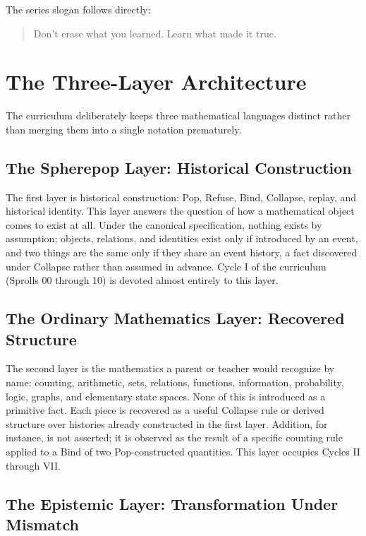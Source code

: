\documentclass[11pt,twoside]{book}
\begin{document}
The series slogan follows directly:

\begin{quote}
Don't erase what you learned. Learn what made it true.
\end{quote}

\chapter{The Three-Layer Architecture}

The curriculum deliberately keeps three mathematical languages distinct rather than merging them into a single notation prematurely.

\section{The Spherepop Layer: Historical Construction}

The first layer is historical construction: Pop, Refuse, Bind, Collapse, replay, and historical identity. This layer answers the question of how a mathematical object comes to exist at all. Under the canonical specification, nothing exists by assumption; objects, relations, and identities exist only if introduced by an event, and two things are the same only if they share an event history, a fact discovered under Collapse rather than assumed in advance. Cycle I of the curriculum (Sprolls 00 through 10) is devoted almost entirely to this layer.

\section{The Ordinary Mathematics Layer: Recovered Structure}

The second layer is the mathematics a parent or teacher would recognize by name: counting, arithmetic, sets, relations, functions, information, probability, logic, graphs, and elementary state spaces. None of this is introduced as a primitive fact. Each piece is recovered as a useful Collapse rule or derived structure over histories already constructed in the first layer. Addition, for instance, is not asserted; it is observed as the result of a specific counting rule applied to a Bind of two Pop-constructed quantities. This layer occupies Cycles II through VII.

\section{The Epistemic Layer: Transformation Under Mismatch}
\end{document}
